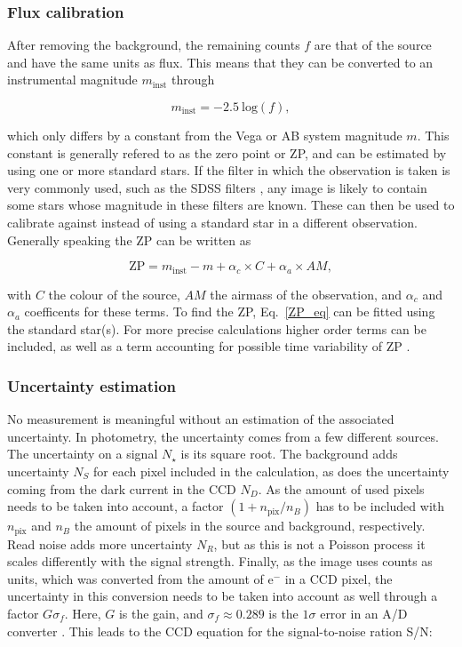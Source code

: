 \documentclass[a4paper,oneside,12pt, class=Latex/Classes/PhDthesisPSnPDF, crop=false]{standalone}
\begin{document}
\subsubsection*{Flux calibration}
After removing the background, the remaining counts $f$ are that of the source and have the same units as flux. This means that they can be converted to an instrumental magnitude $m_\text{inst}$ through

\begin{equation}
    m_\text{inst} = -2.5\ \text{log}(f),
    \label{flux_to_mag}
\end{equation}

which only differs by a constant from the Vega or AB system magnitude $m$. This constant is generally refered to as the zero point or ZP, and can be estimated by using one or more standard stars. If the filter in which the observation is taken is very commonly used, such as the SDSS filters \ztfg\ztfr\ztfi, any image is likely to contain some stars whose magnitude in these filters are known. These can then be used to calibrate against instead of using a standard star in a different observation. Generally speaking the ZP can be written as

\begin{equation}
    \text{ZP} = m_\text{inst} - m + \alpha_c\times C + \alpha_a \times AM,
    \label{ZP_eq}
\end{equation}

with $C$ the colour of the source, $AM$ the airmass of the observation, and $\alpha_c$ and $\alpha_a$ coefficents for these terms. To find the ZP, Eq.~\ref{ZP_eq} can be fitted using the standard star(s). For more precise calculations higher order terms can be included, as well as a term accounting for possible time variability of ZP \citep[as has for instance been done in][]{ZP_calc}.


\subsubsection*{Uncertainty estimation}
No measurement is meaningful without an estimation of the associated uncertainty. In photometry, the uncertainty comes from a few different sources. The uncertainty on a signal $N_\star$ is its square root. The background adds uncertainty $N_S$ for each pixel included in the calculation, as does the uncertainty coming from the dark current in the CCD $N_D$. As the amount of used pixels needs to be taken into account, a factor $(1+n_\text{pix}/n_B)$ has to be included with $n_\text{pix}$ and $n_B$ the amount of pixels in the source and background, respectively. Read noise adds more uncertainty $N_R$, but as this is not a Poisson process it scales differently with the signal strength. Finally, as the image uses counts as units, which was converted from the amount of e$^-$ in a CCD pixel, the uncertainty in this conversion needs to be taken into account as well through a factor $G\sigma_f$. Here, $G$ is the gain, and $\sigma_f\approx0.289$ is the $1\sigma$ error in an A/D converter \citep{max_aperture}. This leads to the CCD equation for the signal-to-noise ration S/N:
\end{document}
